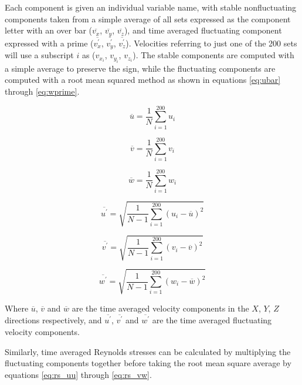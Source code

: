 Each component is given an individual variable name, with stable nonfluctuating 
components taken from a simple average of all sets expressed as the component 
letter with an over bar ($\overline{v_x}$, $\overline{v_y}$, $\overline{v_z}$), 
and 
time averaged fluctuating component expressed with a prime 
($\overline{v_x^\prime}$, $\overline{v_y^\prime}$, $\overline{v_z^\prime}$). 
Velocities referring to just one of the 200 sets will use a 
subscript $i$ as ($v_{x_i}$, $v_{y_i}$, $v_{z_i}$). The stable components are 
computed with 
a simple average to preserve the sign, while the fluctuating components are 
computed with a root mean squared method as shown in equations \ref{eq:ubar} 
through \ref{eq:wprime}.

\begin{equation}
\overline{u}  = \frac{1}{N} \sum_{i=1}^{200} u_i
\label{eq:ubar}
\end{equation}

\begin{equation}
\overline{v}  = \frac{1}{N} \sum_{i=1}^{200} v_i
\end{equation}

\begin{equation}
\overline{w}  = \frac{1}{N} \sum_{i=1}^{200} w_i
\end{equation}

\begin{equation}
\overline{u^\prime} = \sqrt{\frac{1}{N-1} \sum_{i=1}^{200} (u_i - 
\overline{u})^2}
\end{equation}

\begin{equation}
\overline{v^\prime} = \sqrt{\frac{1}{N-1} \sum_{i=1}^{200} (v_i - 
\overline{v})^2}
\end{equation}

\begin{equation}
\overline{w^\prime} = \sqrt{\frac{1}{N-1} \sum_{i=1}^{200} (w_i - 
\overline{w})^2}
\label{eq:wprime}
\end{equation}

Where $\overline{u}$, $\overline{v}$ and $\overline{w}$ are the time averaged 
velocity 
components in the $X$, $Y$, $Z$ directions respectively, and  
$\overline{u^\prime}$, $\overline{v^\prime}$ and $\overline{w^\prime}$ are the 
time averaged fluctuating velocity components.

Similarly, time averaged Reynolds stresses can be calculated by multiplying the 
fluctuating components together before taking the root mean square average by 
equations \ref{eq:rs_uu} through \ref{eq:rs_vw}.

